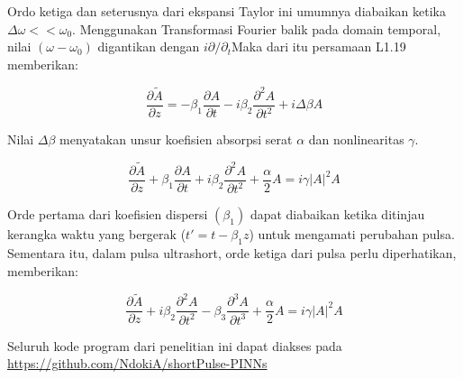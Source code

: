 Ordo ketiga dan seterusnya dari ekspansi Taylor ini umumnya diabaikan ketika \(\Delta \omega << \omega_0\). Menggunakan Transformasi Fourier balik pada domain temporal, nilai \((\omega - \omega_0)\)  digantikan dengan \(i\partial/\partial_t\)Maka dari itu persamaan L1.19 memberikan: 

\begin{equation}
    \frac{\partial\tilde{A}}{\partial z} = -\beta_1 \frac{\partial A}{\partial t} -  i\beta_2 \frac{\partial^2 A}{\partial t^2} + i \Delta \beta A
\end{equation}

Nilai \(\Delta \beta\) menyatakan unsur koefisien absorpsi serat \(\alpha\) dan nonlinearitas \(\gamma\).

\begin{equation}
    \frac{\partial\tilde{A}}{\partial z} +\beta_1 \frac{\partial A}{\partial t} +  i\beta_2 \frac{\partial^2 A}{\partial t^2} + \frac{\alpha}{2}A = i\gamma|A|^2A
\end{equation}

Orde pertama dari koefisien dispersi \((\beta_1)\) dapat diabaikan ketika ditinjau kerangka waktu yang bergerak (\(t' = t-\beta_1z\)) untuk mengamati perubahan pulsa. Sementara itu, dalam pulsa ultrashort, orde ketiga dari pulsa perlu diperhatikan, memberikan:

\begin{equation}
    \frac{\partial\tilde{A}}{\partial z}  +  i\beta_2 \frac{\partial^2 A}{\partial t^2} - \beta_3 \frac{\partial^3A}{\partial t^3} + \frac{\alpha}{2}A = i\gamma|A|^2A
\end{equation}

\newpage 
{}

Seluruh kode program dari penelitian ini dapat diakses pada \url{https://github.com/NdokiA/shortPulse-PINNs}
